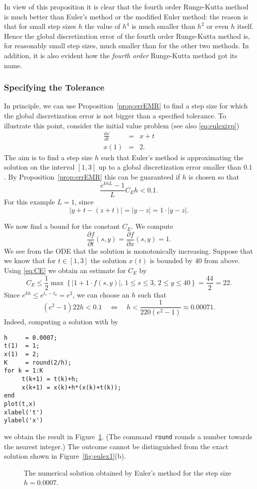 \documentclass{ximera}
\begin{document}
In view of this proposition it is clear that the fourth order Runge-Kutta 
method is much better than Euler's method or the modified
Euler method: the reason is that for small step sizes $h$ the value of 
$h^4$ is much smaller than $h^2$ or even $h$ itself.  Hence the
global discretization error of the fourth order Runge-Kutta method is,
for reasonably small step sizes, much smaller than for the other two
methods.  In addition, it is also evident how the {\em fourth order\/} 
Runge-Kutta method got its name.

\subsubsection*{Specifying the Tolerance}

In principle, we can use Proposition~\ref{prop:errEMR} to find a step 
size for which the global discretization error is not bigger than a
specified tolerance.  To illustrate this point,  
consider the initial value problem (see also \eqref{eq:eulexivp})
\begin{eqnarray*}
\frac{dx}{dt} & = & x+t \\
x(1) & = & 2.
\end{eqnarray*}
The aim is to find a step size $h$ such that Euler's method is
approximating the solution on the interval $[1,3]$ up to a global 
discretization error smaller than $0.1$.  By Proposition~\ref{prop:errEMR}
this can be guaranteed if $h$ is chosen so that
\[
\frac{e^{khL}-1}{L}C_E h < 0.1.
\]
For this example $L=1$, since
\[
|y+t-(z+t)|=|y-z|=1\cdot |y-z|.
\]

We now find a bound for the constant $C_E$.  We compute
\[
\frac{\partial f}{\partial t}(s,y)=\frac{\partial f}{\partial x}(s,y)=1.
\]
We see from the ODE that the solution is monotonically increasing.
Suppose that we know that for $t\in [1,3]$ the solution $x(t)$ is bounded
by $40$ from above.  Using \eqref{eq:CE} we obtain an estimate for $C_E$ by
\[
C_E\le \frac{1}{2}\max\left\{\vert 1+1\cdot f(s,y)\vert,\, 1\le s\le 3,\,
2 \le y \le 40 \right\}=\frac{44}{2}=22.
\]
Since $e^{kh}\le e^{t_e-t_0}=e^2$, we can choose an $h$ such that
\[
(e^2-1)22h < 0.1\quad \Longleftrightarrow 
\quad h<\frac{1}{220(e^2-1)}\approx 0.00071.
\]
Indeed, computing a solution with \Matlab by
\begin{verbatim}
h     = 0.0007;
t(1)  = 1;
x(1)  = 2;
K     = round(2/h);
for k = 1:K
     t(k+1) = t(k)+h;
     x(k+1) = x(k)+h*(x(k)+t(k));
end
plot(t,x)
xlabel('t')
ylabel('x')
\end{verbatim}
we obtain the result in Figure~\ref{fig:hsmall}.  (The \Matlab
command {\tt round} rounds a number towards the nearest integer.)
The outcome cannot be distinguished from the exact solution shown 
in Figure~\ref{fig:eulex1}(b).

\begin{figure}[htb]
   \centerline{%
   }
   \caption{The numerical solution obtained by Euler's method for the 
   step size $h=0.0007$.}
   \label{fig:hsmall}
\end{figure}



\end{document}
